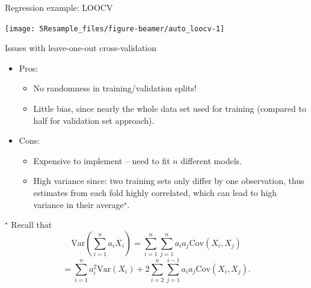 \documentclass[
  10pt,
  ignorenonframetext,
]{beamer}
\providecommand{\tightlist}{%
  \setlength{\itemsep}{0pt}\setlength{\parskip}{0pt}}
\begin{document}
\begin{frame}
\begin{block}{Regression example: LOOCV}
\protect\hypertarget{regression-example-loocv}{}
\begin{center}\texttt{[image: 5Resample\_files/figure-beamer/auto\_loocv-1]} \end{center}

\tiny

\normalsize
\end{block}
\end{frame}

\begin{frame}
\begin{block}{Issues with leave-one-out cross-validation}
\protect\hypertarget{issues-with-leave-one-out-cross-validation}{}
\(~\)

\begin{itemize}
\tightlist
\item
  Pros:

  \begin{itemize}
  \tightlist
  \item
    No randomness in training/validation splits!
  \item
    Little bias, since nearly the whole data set used for training
    (compared to half for validation set approach).
  \end{itemize}
\end{itemize}

\vspace{2mm}

\begin{itemize}
\tightlist
\item
  Cons:

  \begin{itemize}
  \tightlist
  \item
    Expensive to implement -- need to fit \(n\) different models.
  \item
    High variance since: two training sets only differ by one
    observation, thus estimates from each fold highly correlated, which
    can lead to high variance in their average\(^\star\).
  \end{itemize}
\end{itemize}

\vspace{5mm}
\scriptsize

\(^\star\) Recall that
\[\text{Var}(\sum_{i=1}^na_iX_i)=\sum_{i=1}^n\sum_{j=1}^n a_ia_j\text{Cov}(X_i,X_j)\]
\[=\sum_{i=1}^na_i^2\text{Var}(X_i)+2\sum_{i=2}^n \sum_{j=1}^{i-1}
a_ia_j\text{Cov}(X_i,X_j).\]
\end{block}
\end{frame}
\end{document}
